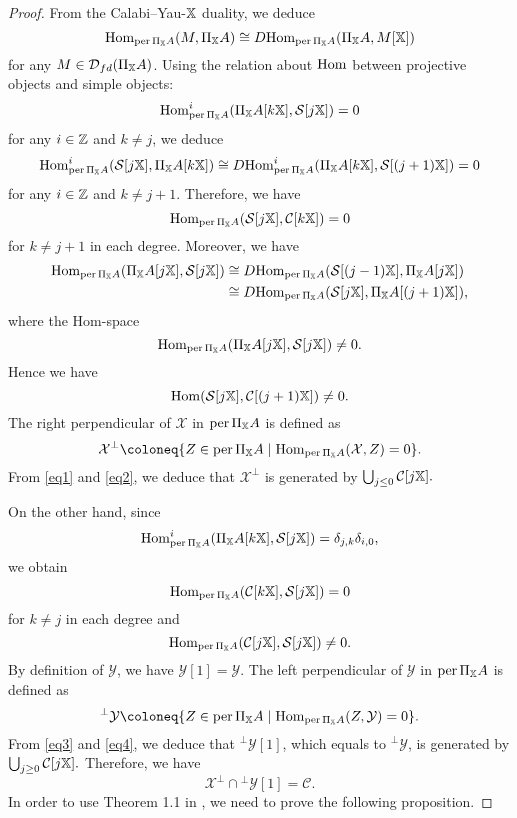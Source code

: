 \begin{proof}
  From the Calabi--Yau-$\mathbb{X}$ duality, we deduce
  \[
    \operatorname{Hom}_{\operatorname{per}\Pi_{\mathbb{X}}A}(M, \Pi_{\mathbb{X}}A)
    \cong \operatorname{\mathnormal{D}Hom}_{\operatorname{per}\Pi_{\mathbb{X}}A}(\Pi_{\mathbb{X}}A, M[\mathbb{X}])
  \]
  for any $M \in \operatorname{\mathcal{D}}_{fd}(\Pi_{\mathbb{X}}A)$.
  Using the relation about $\operatorname{Hom}$ between projective objects and simple objects:
  \[
    \operatorname{Hom}^i_{\operatorname{per}\Pi_{\mathbb{X}}A}(\Pi_{\mathbb{X}}A[k\mathbb{X}], \mathcal{S}[j\mathbb{X}]) = 0
  \]
  for any $i \in \mathbb{Z}$ and $k \neq j$, we deduce
  \[
    \operatorname{Hom}^i_{\operatorname{per}\Pi_{\mathbb{X}}A}(\mathcal{S}[j\mathbb{X}],\Pi_{\mathbb{X}}A[k\mathbb{X}])
    \cong \operatorname{\mathnormal{D}Hom}^i_{\operatorname{per}\Pi_{\mathbb{X}}A}(\Pi_{\mathbb{X}}A[k\mathbb{X}], \mathcal{S}[(j+1)\mathbb{X}]) = 0
  \]
  for any $i \in \mathbb{Z}$ and $k \neq j+1$. Therefore, we have
  \begin{equation}\label{eq1}
    \operatorname{Hom}_{\operatorname{per}\Pi_{\mathbb{X}}A}(\mathcal{S}[j\mathbb{X}], \mathcal{C}[k\mathbb{X}]) = 0
  \end{equation}
  for $k \neq j+1$ in each degree. Moreover, we have
  \begin{align*}
    \operatorname{Hom}_{\operatorname{per}\Pi_{\mathbb{X}}A}(\Pi_{\mathbb{X}}A[j\mathbb{X}], \mathcal{S}[j\mathbb{X}])
    &\cong \operatorname{\mathnormal{D}Hom}_{\operatorname{per} \Pi_{\mathbb{X}}A}(\mathcal{S}[(j-1)\mathbb{X}], \Pi_{\mathbb{X}}A[j\mathbb{X}]) \\
    &\cong \operatorname{\mathnormal{D}Hom}_{\operatorname{per} \Pi_{\mathbb{X}}A}(\mathcal{S}[j\mathbb{X}], \Pi_{\mathbb{X}}A[(j+1)\mathbb{X}]),
  \end{align*}
  where the Hom-space
  \[ \operatorname{Hom}_{\operatorname{per}\Pi_{\mathbb{X}}A}(\Pi_{\mathbb{X}}A[j\mathbb{X}], \mathcal{S}[j\mathbb{X}]) \neq 0. \]
  Hence we have
  \begin{equation}\label{eq2}
    \operatorname{Hom}(\mathcal{S}[j\mathbb{X}], \mathcal{C}[(j+1)\mathbb{X}]) \neq 0.
  \end{equation}
  The right perpendicular of $\mathcal{X}$ in $\operatorname{per}\Pi_{\mathbb{X}}A$ is defined as
  \[
    \mathcal{X}^{\bot} \coloneq
    \{Z \in \per\Pi_{\XX}A \mid \Hom_{\per\Pi_{\XX}A}(\mathcal{X},Z) = 0\}.
  \]
  From \eqref{eq1} and \eqref{eq2},
  we deduce that $\mathcal{X}^{\bot}$ is generated by
  $\bigcup_{j \leq 0}\mathcal{C}[j\mathbb{X}].$

  On the other hand, since
  \[
    \operatorname{Hom}^i_{\operatorname{per}\Pi_{\mathbb{X}}A}(\Pi_{\mathbb{X}}A[k\mathbb{X}], \mathcal{S}[j\mathbb{X}])
    = \delta_{j,k}\delta_{i,0},
  \]
  we obtain
  \begin{equation}\label{eq3}
    \operatorname{Hom}_{\operatorname{per}\Pi_{\mathbb{X}}A}(\mathcal{C}[k\mathbb{X}], \mathcal{S}[j\mathbb{X}]) = 0
  \end{equation}
  for $k \neq j$ in each degree and
  \begin{equation}\label{eq4}
    \operatorname{Hom}_{\operatorname{per}\Pi_{\mathbb{X}}A}(\mathcal{C}[j\mathbb{X}], \mathcal{S}[j\mathbb{X}]) \neq 0.
  \end{equation}
  By definition of $\mathcal{Y}$, we have $\mathcal{Y}[1] = \mathcal{Y}$.
  The left perpendicular of $\mathcal{Y}$ in $\operatorname{per}\Pi_{\mathbb{X}}A$ is defined as
  \[
    {}^{\bot}\mathcal{Y} \coloneq
    \{Z \in \per\Pi_{\XX}A \mid \Hom_{\per\Pi_{\XX}A}(Z,\mathcal{Y}) = 0\}.
  \]
  From \eqref{eq3} and \eqref{eq4}, we deduce that $^{\bot}\mathcal{Y}[1]$,
  which equals to $^{\bot}\mathcal{Y}$,
  is generated by $\bigcup_{j \geq 0}\mathcal{C}[j\mathbb{X}].$
  Therefore, we have
  \[ \mathcal{X}^{\bot} \cap {}^{\bot}\mathcal{Y}[1] = \mathcal{C}. \]
  In order to use Theorem 1.1 in \cite{IY},
  we need to prove the following proposition.
  \phantom{\qedhere}
\end{proof}


